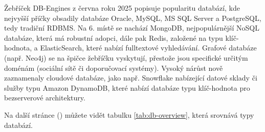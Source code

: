 Žebříček DB-Engines z června roku 2025 popisuje popularitu databází,
kde nejvyšší příčky obsadily databáze Oracle, MySQL, MS SQL Server
a PostgreSQL, tedy tradiční RDBMS. Na 6. místě se nachází MongoDB,
nejpopulárnější NoSQL databáze, která má robustní adopci, dále pak
Redis, založené na typu klíč-hodnota, a ElasticSearch, které nabízí
fulltextové vyhledávání. Grafové databáze (např. Neo4j) se na špičce
žebříčku vyskytují, přestože jsou specifické určitým doménám
(sociální sítě či doporučovací systémy). Vysoký nárůst nově zaznamenaly
cloudové databáze, jako např. Snowflake nabízející datové sklady či služby
typu Amazon DynamoDB, které nabízí databáze typu klíč-hodnota
pro bezserverové architektury. \cite{YHVfLHsNlUItkF6G,gT0jW3Rz4pdfcjnO}

Na další stránce (\pageref{tab:db-overview}) můžete vidět
tabulku \ref{tab:db-overview}, která srovnává typy databází.

